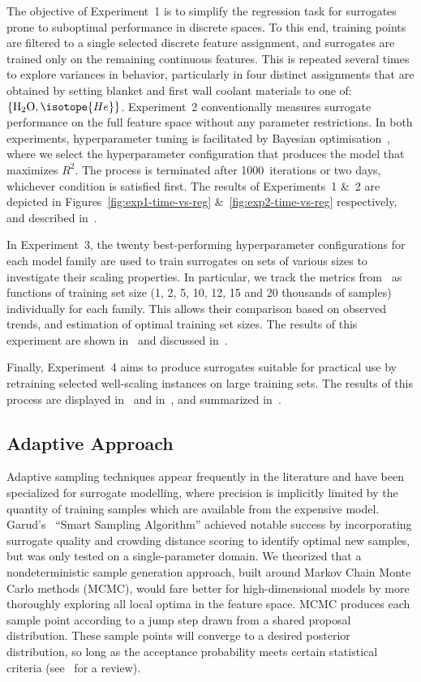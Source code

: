 The objective of Experiment~1 is to simplify the regression task for
surrogates prone to suboptimal performance in discrete spaces.
To this end, training points are filtered to a single selected discrete feature
assignment, and surrogates are trained only on the remaining continuous features.
This is repeated several times to explore variances in behavior,
particularly in four distinct assignments that are obtained by setting blanket and
first wall coolant materials to one
of:~$\{\text{H\textsubscript{2}O},\isotope{He}\}$.
Experiment~2 conventionally measures surrogate performance on the full feature
space without any parameter restrictions. In both experiments, hyperparameter tuning is
facilitated by Bayesian optimisation~\cite{movckus1975bayesian}, where we select the
hyperparameter configuration that produces the model that maximizes $R^2$. The
process is terminated after 1000~iterations or two days, whichever condition is satisfied first.
The results of Experiments~1 \&~2 are depicted
in Figures~\ref{fig:exp1-time-vs-reg} \&~\ref{fig:exp2-time-vs-reg}
respectively, and described in~.

In Experiment~3, the twenty best-performing hyperparameter configurations
for each model family are used to train surrogates on sets of various sizes to
investigate their scaling properties. In particular, we track the metrics
from~ as functions of training set size (1, 2, 5, 10, 12, 15 and 20 thousands
of samples) individually for each family. This allows their comparison based on
observed trends, and estimation of optimal training set sizes.
The results of this experiment are shown in~ and discussed
in~.

Finally, Experiment~4 aims
to produce surrogates suitable for practical use by retraining selected
well-scaling instances on large training sets.
The results of this process are displayed in~ and
in~, and summarized in~.


\subsection{Adaptive Approach}\label{sec:adaptive}

Adaptive sampling techniques appear frequently in the literature and have been
specialized for surrogate modelling, where precision is implicitly limited by the quantity of training samples which are available from the expensive model. Garud's~\cite{Garud2016} ``Smart Sampling Algorithm'' achieved notable success by incorporating surrogate quality and
crowding distance scoring to identify optimal new samples, but was only tested
on a single-parameter domain. We theorized that a nondeterministic sample
generation approach, built around Markov Chain Monte Carlo methods (MCMC), would
fare better for high-dimensional models by more thoroughly exploring all local
optima in the feature space. MCMC produces each sample point according to a jump step drawn from a shared proposal
distribution. These sample points will converge to a desired posterior
distribution, so long as the acceptance probability meets certain statistical criteria (see~\cite{Zhou2018} for a review).

